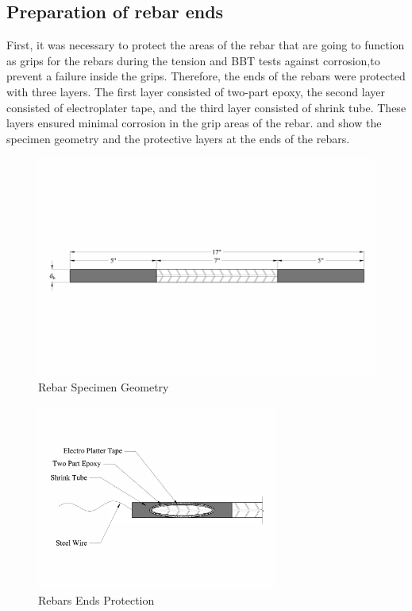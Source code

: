 \subsection{Preparation of rebar ends}

First, it was necessary to protect the areas of the rebar that are going to function as grips for the rebars during the tension and BBT tests against corrosion,to prevent a failure inside the grips. Therefore, the ends of the rebars were protected with three layers. The first layer consisted of two-part epoxy, the second layer consisted of electroplater tape, and the third layer consisted of shrink tube. These layers ensured minimal corrosion in the grip areas of the rebar.  and  show the specimen geometry and the protective layers at the ends of the rebars.
\begin{figure}[htbp]
	\centering
	\includegraphics[width=1.0\textwidth]{Chapter-3/figs/RebarSamples}
	\caption{Rebar Specimen Geometry}
	\label{fig:RebarSpecimenGeomtry}
\end{figure}

\begin{figure}[htbp]
	\centering
	\includegraphics[width=0.7\textwidth]{Chapter-3/figs/Rebar_Ends}
	\caption{Rebars Ends Protection}
	\label{fig:RebarEndsProtection}
\end{figure}
\newpage 

